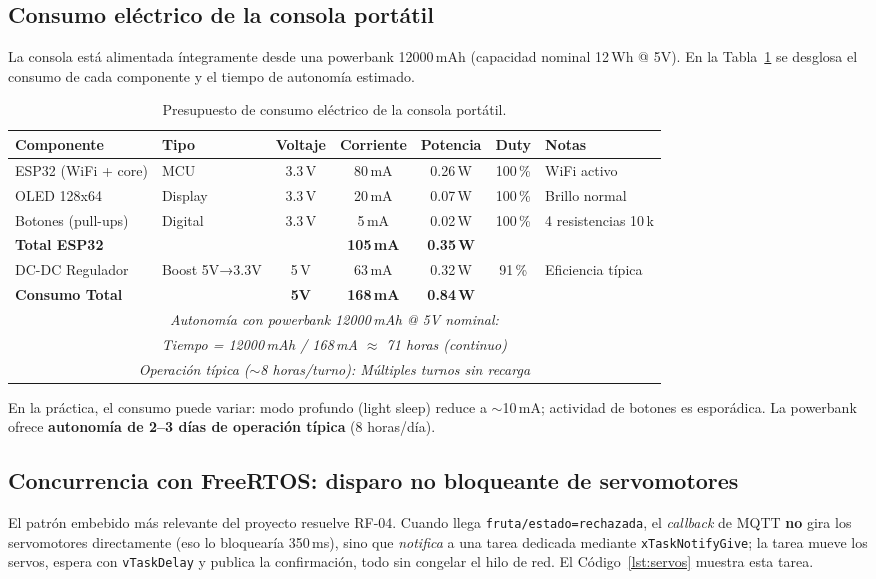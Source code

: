 \documentclass[12pt]{catolica_proyectos}
\begin{document}
\subsection{Consumo eléctrico de la consola portátil}
La consola está alimentada íntegramente desde una powerbank 12000\,mAh (capacidad nominal 12\,Wh @ 5V). En la Tabla~\ref{tab:consumo} se desglosa el consumo de cada componente y el tiempo de autonomía estimado.

\begin{table}[H]
\centering
\caption{Presupuesto de consumo eléctrico de la consola portátil.}
\label{tab:consumo}
\footnotesize
\begin{tabular}{@{}llccccl@{}}
\toprule
\textbf{Componente} & \textbf{Tipo} & \textbf{Voltaje} & \textbf{Corriente} & \textbf{Potencia} & \textbf{Duty} & \textbf{Notas} \\
\midrule
ESP32 (WiFi + core) & MCU & 3.3\,V & 80\,mA & 0.26\,W & 100\,\% & WiFi activo \\
OLED 128x64 & Display & 3.3\,V & 20\,mA & 0.07\,W & 100\,\% & Brillo normal \\
Botones (pull-ups) & Digital & 3.3\,V & 5\,mA & 0.02\,W & 100\,\% & 4 resistencias 10\,k \\
\midrule
\textbf{Total ESP32} & & & \textbf{105\,mA} & \textbf{0.35\,W} & & \\
\midrule
DC-DC Regulador & Boost 5V→3.3V & 5\,V & 63\,mA & 0.32\,W & 91\,\% & Eficiencia típica \\
\midrule
\textbf{Consumo Total} & & \textbf{5V} & \textbf{168\,mA} & \textbf{0.84\,W} & & \\
\midrule
\multicolumn{7}{c}{\textit{Autonomía con powerbank 12000\,mAh @ 5V nominal:}} \\
\multicolumn{7}{c}{\textit{Tiempo = 12000\,mAh / 168\,mA $\approx$ 71 horas (continuo)}} \\
\multicolumn{7}{c}{\textit{Operación típica ($\sim$8 horas/turno): Múltiples turnos sin recarga}} \\
\bottomrule
\end{tabular}
\end{table}

En la práctica, el consumo puede variar: modo profundo (light sleep) reduce a $\sim$10\,mA; actividad de botones es esporádica. La powerbank ofrece \textbf{autonomía de 2--3 días de operación típica} (8 horas/día).

\subsection{Concurrencia con FreeRTOS: disparo no bloqueante de servomotores}
El patrón embebido más relevante del proyecto resuelve RF-04. Cuando llega \texttt{fruta/estado=rechazada}, el \emph{callback} de MQTT \textbf{no} gira los servomotores directamente (eso lo bloquearía 350\,ms), sino que \emph{notifica} a una tarea dedicada mediante \texttt{xTaskNotifyGive}; la tarea mueve los servos, espera con \texttt{vTaskDelay} y publica la confirmación, todo sin congelar el hilo de red. El Código~\ref{lst:servos} muestra esta tarea.
\end{document}
